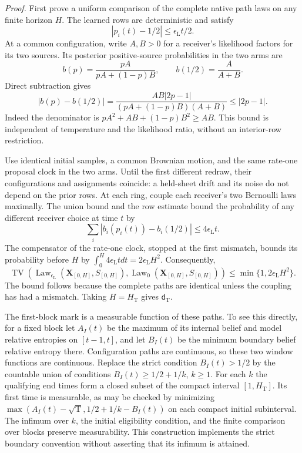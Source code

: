 \noindent\emph{Proof.}
First prove a uniform comparison of the complete native path laws on
any finite horizon \(H\). The learned rows are deterministic and satisfy
\[
 |p_i(t)-1/2|\le\epsilon_{\mathrm L}t/2.
\]
At a common configuration, write \(A,B>0\) for a receiver's likelihood
factors for its two sources. Its posterior positive-source probabilities
in the two arms are
\[
 b(p)=\frac{pA}{pA+(1-p)B},
 \qquad b(1/2)=\frac A{A+B}.
\]
Direct subtraction gives
\[
 |b(p)-b(1/2)|
 =\frac{AB|2p-1|}{(pA+(1-p)B)(A+B)}
 \le|2p-1|.
\]
Indeed the denominator is
\(pA^2+AB+(1-p)B^2\ge AB\). This bound is independent of
temperature and the likelihood ratio, without an interior-row restriction.

Use identical initial samples, a common Brownian motion, and the same
rate-one proposal clock in the two arms. Until the first different redraw,
their configurations and assignments coincide: a held-sheet drift and its
noise do not depend on the prior rows. At each ring, couple each receiver's
two Bernoulli laws maximally. The union bound and the row estimate bound
the probability of any different receiver choice at time \(t\) by
\[
 \sum_i|b_i(p_i(t))-b_i(1/2)|
 \le4\epsilon_{\mathrm L}t.
\]
The compensator of the rate-one clock, stopped at the first mismatch,
bounds its probability before \(H\) by
\(\int_0^H4\epsilon_{\mathrm L}t dt=2\epsilon_{\mathrm L}H^2\).
Consequently,
\begin{equation}
 \operatorname{TV}\left(
 \operatorname{Law}_{\epsilon_{\mathrm L}}(\mathbf X_{[0,H]},S_{[0,H]}),
 \operatorname{Law}_0(\mathbf X_{[0,H]},S_{[0,H]})\right)
 \le\min\{1,2\epsilon_{\mathrm L}H^2\}.
\label{eq:phil-early-path-coupling}
\end{equation}
The bound follows because the complete paths are identical unless the
coupling has had a mismatch. Taking \(H=H_{\mathrm T}\) gives
\(\mathsf d_{\mathrm T}\).

The first-block mark is a measurable function of these paths. To see this
directly, for a fixed block let \(A_I(t)\) be the maximum of its internal
belief and model relative entropies on \([t-1,t]\), and let \(B_I(t)\)
be the minimum boundary belief relative entropy there. Configuration
paths are continuous, so these two window functions are continuous.
Replace the strict condition \(B_I(t)>1/2\) by the countable union of
conditions \(B_I(t)\ge1/2+1/k\), \(k\ge1\). For each \(k\) the
qualifying end times form a closed subset of the compact interval
\([1,H_{\mathrm T}]\). Its first time is measurable, as may be checked
by minimizing
\(\max(A_I(t)-\sqrt{\mathrm T},1/2+1/k-B_I(t))\) on each compact
initial subinterval. The infimum over \(k\), the initial eligibility
condition, and the finite comparison over blocks preserve measurability.
This construction implements the strict boundary convention without
asserting that its infimum is attained.


